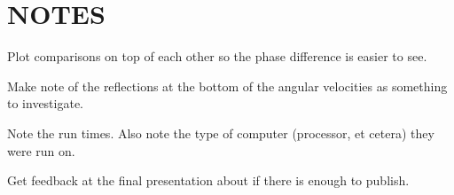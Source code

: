 \documentclass{lebook}
\begin{document}


\frontmatter{}
\pagestyle{cnpcusareportothermatter}

\tableofcontents{}
\listoffigures{}
\listoftables{}



\mainmatter{}
\pagestyle{cnpcusareportothermatter}




\chapter{NOTES}
\begin{bulletedlist}
	\item Plot comparisons on top of each other so the phase difference is easier to see.
	\item Make note of the reflections at the bottom of the angular velocities as something to investigate.
	\item Note the run times.  Also note the type of computer (processor, et cetera) they were run on.
	\item Get feedback at the final presentation about if there is enough to publish.
\end{bulletedlist}








\appendix{}




%


\backmatter{}
\pagestyle{cnpcusareportothermatter}


\printglossary[type=main, title=Glossary]{}
\renewcommand*{\chaptertitle}{Glossary}

\printglossary[type=\acronymtype]
\renewcommand*{\chaptertitle}{Acronyms}

%

\glsaddallunused{}


\end{document}
